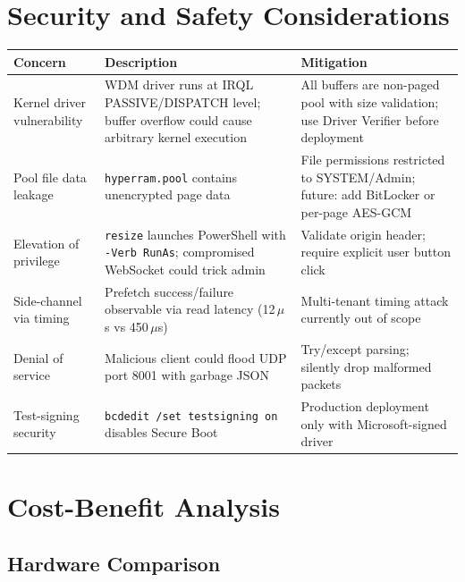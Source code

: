 \documentclass[11pt,a4paper]{article}
\newcommand{\code}[1]{\texttt{#1}}
\newcommand{\micro}{$\mu$}
\begin{document}
\section{Security and Safety Considerations}
\label{sec:security}

\begin{longtable}{p{3.5cm}p{4cm}p{6cm}}
\toprule
\textbf{Concern} & \textbf{Description} & \textbf{Mitigation} \\
\midrule
\endhead
Kernel driver vulnerability & WDM driver runs at IRQL PASSIVE/DISPATCH level; buffer overflow could cause arbitrary kernel execution & All buffers are non-paged pool with size validation; use Driver Verifier before deployment \\
Pool file data leakage & \code{hyperram.pool} contains unencrypted page data & File permissions restricted to SYSTEM/Admin; future: add BitLocker or per-page AES-GCM \\
Elevation of privilege & \code{resize} launches PowerShell with \code{-Verb RunAs}; compromised WebSocket could trick admin & Validate origin header; require explicit user button click \\
Side-channel via timing & Prefetch success/failure observable via read latency (12\,\micro{}s vs 450\,\micro{}s) & Multi-tenant timing attack currently out of scope \\
Denial of service & Malicious client could flood UDP port 8001 with garbage JSON & Try/except parsing; silently drop malformed packets \\
Test-signing security & \code{bcdedit /set testsigning on} disables Secure Boot & Production deployment only with Microsoft-signed driver \\
\bottomrule
\end{longtable}

\section{Cost-Benefit Analysis}
\label{sec:cost}

\subsection{Hardware Comparison}
\end{document}
